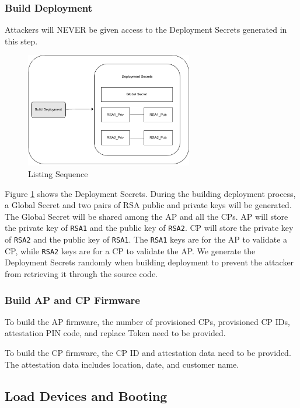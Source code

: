 \documentclass[11pt,oneside,onecolumn,letterpaper]{article}
\begin{document}
	\subsubsection{Build Deployment}
	Attackers will NEVER be given access to the Deployment Secrets generated in this step.
	\begin{figure}[h]
		\centering
		\includegraphics[width=0.65\textwidth]{pics/secret.pdf}
		\caption{Listing Sequence}
		\label{fig:secret}
	\end{figure}
	
	Figure \ref{fig:secret} shows the Deployment Secrets.
	During the building deployment process,
	a Global Secret and two pairs of RSA public and private keys will be generated.
	The Global Secret will be shared among the AP and all the CPs.
	AP will store the private key of \texttt{RSA1} and the public key of \texttt{RSA2}.
	CP will store the private key of \texttt{RSA2} and the public key of \texttt{RSA1}.
	The \texttt{RSA1} keys are for the AP to validate a CP,
	while \texttt{RSA2} keys are for a CP to validate the AP.
	We generate the Deployment Secrets randomly when building deployment to prevent the attacker from retrieving it through the source code.
	
	\subsubsection{Build AP and CP Firmware}
	To build the AP firmware,
	the number of provisioned CPs,
	provisioned CP IDs,
	attestation PIN code,
	and replace Token need to be provided.
	
	To build the CP firmware,
	the CP ID and attestation data need to be provided.
	The attestation data includes location,
	date,
	and customer name.
	
	\subsection{Load Devices and Booting}
\end{document}
